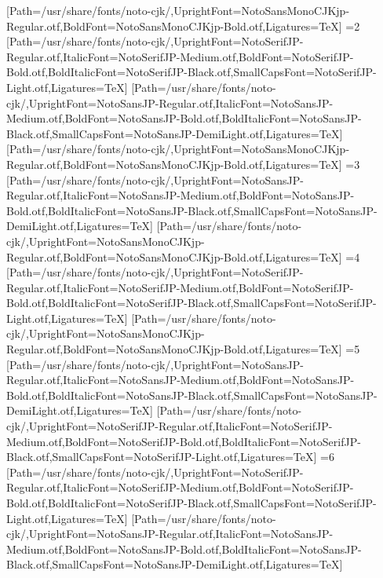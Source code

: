 [Path=/usr/share/fonts/noto-cjk/,UprightFont=NotoSansMonoCJKjp-Regular.otf,BoldFont=NotoSansMonoCJKjp-Bold.otf,Ligatures=TeX]
\else\ifnum\value{CJKFonts}=2
[Path=/usr/share/fonts/noto-cjk/,UprightFont=NotoSerifJP-Regular.otf,ItalicFont=NotoSerifJP-Medium.otf,BoldFont=NotoSerifJP-Bold.otf,BoldItalicFont=NotoSerifJP-Black.otf,SmallCapsFont=NotoSerifJP-Light.otf,Ligatures=TeX]
[Path=/usr/share/fonts/noto-cjk/,UprightFont=NotoSansJP-Regular.otf,ItalicFont=NotoSansJP-Medium.otf,BoldFont=NotoSansJP-Bold.otf,BoldItalicFont=NotoSansJP-Black.otf,SmallCapsFont=NotoSansJP-DemiLight.otf,Ligatures=TeX]
[Path=/usr/share/fonts/noto-cjk/,UprightFont=NotoSansMonoCJKjp-Regular.otf,BoldFont=NotoSansMonoCJKjp-Bold.otf,Ligatures=TeX]
\else\ifnum\value{CJKFonts}=3
[Path=/usr/share/fonts/noto-cjk/,UprightFont=NotoSansJP-Regular.otf,ItalicFont=NotoSansJP-Medium.otf,BoldFont=NotoSansJP-Bold.otf,BoldItalicFont=NotoSansJP-Black.otf,SmallCapsFont=NotoSansJP-DemiLight.otf,Ligatures=TeX]
[Path=/usr/share/fonts/noto-cjk/,UprightFont=NotoSansMonoCJKjp-Regular.otf,BoldFont=NotoSansMonoCJKjp-Bold.otf,Ligatures=TeX]
\else\ifnum\value{CJKFonts}=4
[Path=/usr/share/fonts/noto-cjk/,UprightFont=NotoSerifJP-Regular.otf,ItalicFont=NotoSerifJP-Medium.otf,BoldFont=NotoSerifJP-Bold.otf,BoldItalicFont=NotoSerifJP-Black.otf,SmallCapsFont=NotoSerifJP-Light.otf,Ligatures=TeX]
[Path=/usr/share/fonts/noto-cjk/,UprightFont=NotoSansMonoCJKjp-Regular.otf,BoldFont=NotoSansMonoCJKjp-Bold.otf,Ligatures=TeX]
\else\ifnum\value{CJKFonts}=5
[Path=/usr/share/fonts/noto-cjk/,UprightFont=NotoSansJP-Regular.otf,ItalicFont=NotoSansJP-Medium.otf,BoldFont=NotoSansJP-Bold.otf,BoldItalicFont=NotoSansJP-Black.otf,SmallCapsFont=NotoSansJP-DemiLight.otf,Ligatures=TeX]
[Path=/usr/share/fonts/noto-cjk/,UprightFont=NotoSerifJP-Regular.otf,ItalicFont=NotoSerifJP-Medium.otf,BoldFont=NotoSerifJP-Bold.otf,BoldItalicFont=NotoSerifJP-Black.otf,SmallCapsFont=NotoSerifJP-Light.otf,Ligatures=TeX]
\else\ifnum\value{CJKFonts}=6
[Path=/usr/share/fonts/noto-cjk/,UprightFont=NotoSerifJP-Regular.otf,ItalicFont=NotoSerifJP-Medium.otf,BoldFont=NotoSerifJP-Bold.otf,BoldItalicFont=NotoSerifJP-Black.otf,SmallCapsFont=NotoSerifJP-Light.otf,Ligatures=TeX]
[Path=/usr/share/fonts/noto-cjk/,UprightFont=NotoSansJP-Regular.otf,ItalicFont=NotoSansJP-Medium.otf,BoldFont=NotoSansJP-Bold.otf,BoldItalicFont=NotoSansJP-Black.otf,SmallCapsFont=NotoSansJP-DemiLight.otf,Ligatures=TeX]
